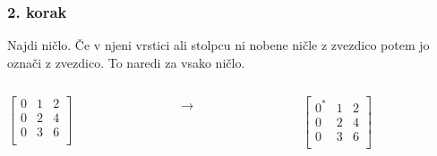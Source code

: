 \documentclass{beamer}
\begin{document}
\begin{frame}
    \frametitle{2. korak}
    \begin{block}{}
        Najdi ničlo. Če v njeni vrstici ali stolpcu ni nobene ničle z zvezdico
        potem jo označi z zvezdico. To naredi za vsako ničlo.
    \end{block}
    \hfill
    \begin{columns}[t]
        \begin{column}{0.25\linewidth}
            $\begin{bmatrix}
                0 & 1 & 2\\
                0 & 2 & 4\\
                0 & 3 & 6\\	
            \end{bmatrix}$
        \end{column}
        \begin{column}{0.005\linewidth}
         \centering
         $ \rightarrow $
        \end{column}
        \hfill
        \begin{column}{0.25\linewidth}
            \centering
            $\begin{bmatrix}
                0^{*} & 1 & 2\\
                0 & 2 & 4\\
                0 & 3 & 6\\	
            \end{bmatrix}$
        \end{column}
    \end{columns}
\end{frame}
\end{document}
